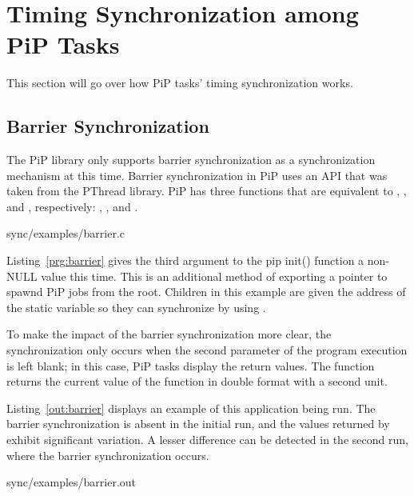 
\section{Timing Synchronization among PiP Tasks}

This section will go over how PiP tasks' timing synchronization works.

\subsection{Barrier Synchronization}

The PiP library only supports barrier synchronization as a
synchronization mechanism at this time. Barrier synchronization in PiP
uses an API that was taken from the PThread library. PiP has three
functions that are equivalent to ,
, and
, respectively:
, , and
. 

 {sync/examples/barrier.c}

Listing~\ref{prg:barrier} gives the third argument to the pip init()
function a non-NULL value this time. This is an additional method of
exporting a pointer to spawnd PiP jobs from the root. Children in this
example are given the address of the  static
variable so they can synchronize by using .

To make the impact of the barrier synchronization more clear, the
synchronization only occurs when the second parameter of the program
execution is left blank; in this case, PiP tasks display the
 return values. The 
function returns the current value of the 
function in double format with a second unit.

Listing~\ref{out:barrier} displays an example of this application
being run. The barrier synchronization is absent in the initial run,
and the values returned by  exhibit
significant variation. A lesser difference can be detected in the
second run, where the barrier synchronization occurs.

 {sync/examples/barrier.out}


